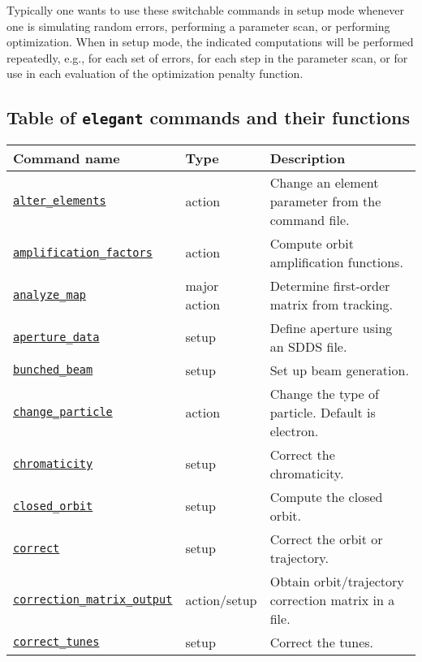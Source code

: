 \documentclass[11pt]{article}
\begin{document}
Typically one wants to use these switchable commands in setup mode whenever one is
simulating random errors, performing a parameter scan, or performing optimization.
When in setup mode, the indicated computations will be performed repeatedly, e.g.,
for each set of errors, for each step in the parameter scan, or for use in each
evaluation of the optimization penalty function.

\newpage
\subsection{Table of {\tt elegant} commands and their functions}

\begin{longtable}{|p{2.75in}|p{0.75in}|p{2.75in}|}
\hline
Command name & Type & Description \\\hline 
\hyperref[subsec:alterelements]{\tt alter\_elements} & action & Change an element parameter from the command file. \\ \hline
\hyperref[subsec:amplificationfactors]{\tt amplification\_factors} & action & Compute orbit amplification functions. \\ \hline
\hyperref[subsec:analyzemap]{\tt analyze\_map} & major action & Determine first-order matrix from tracking. \\ \hline
\hyperref[subsec:aperturedata]{\tt aperture\_data} & setup & Define aperture using an SDDS file. \\ \hline
\hyperref[subsec:bunchedbeam]{\tt bunched\_beam} & setup & Set up beam generation. \\ \hline
\hyperref[subsec:changeparticle]{\tt change\_particle} & action & Change the type of particle. Default is electron.\\ \hline
\hyperref[subsec:chromaticity]{\tt chromaticity} & setup & Correct the chromaticity. \\ \hline
\hyperref[subsec:closedorbit]{\tt closed\_orbit} & setup & Compute the closed orbit. \\ \hline
\hyperref[subsec:correct]{\tt correct} & setup & Correct the orbit or trajectory. \\ \hline
\hyperref[subsec:correctionmatrixoutput]{\tt correction\_matrix\_output} & action/setup & Obtain orbit/trajectory correction matrix in a file. \\ \hline
\hyperref[subsec:correcttunes]{\tt correct\_tunes} & setup & Correct the tunes. \\ \hline

\end{longtable}
\end{document}
